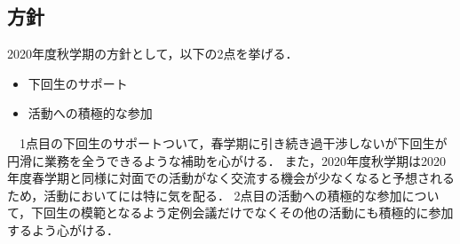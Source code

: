\subsection*{\newGradeIfKouki{}\thirdGrade{}方針}


2020年度秋学期の\thirdGrade{}方針として，以下の2点を挙げる．
\begin{itemize}
  \item 下回生のサポート
  \item 活動への積極的な参加
\end{itemize}
　1点目の下回生のサポートついて，春学期に引き続き過干渉しないが下回生が円滑に業務を全うできるような補助を心がける．
また，2020年度秋学期は2020年度春学期と同様に対面での活動がなく交流する機会が少なくなると予想されるため，活動において\firstGrade{}には特に気を配る．\newline
2点目の活動への積極的な参加について，下回生の模範となるよう定例会議だけでなくその他の活動にも積極的に参加するよう心がける．